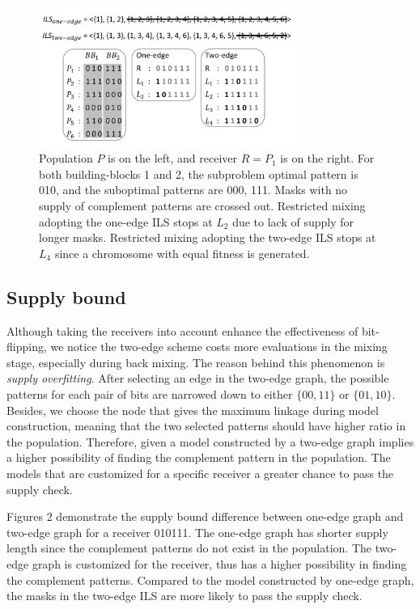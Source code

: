 \documentclass{sig-alternate-05-2015}
\begin{document}
\begin{figure}
\centering
\includegraphics[width=3.4in]{SupplyBound}
\caption{Population $ P $ is on the left, and receiver $ R  = P_{1} $ is on the right. For both building-blocks 1 and 2, the subproblem optimal pattern is 010, and the suboptimal patterns are 000, 111. Masks with no supply of complement patterns are crossed out. Restricted mixing adopting the one-edge ILS stops at $ L_{2}$ due to lack of supply for longer masks. Restricted mixing adopting the two-edge ILS stops at $ L_{4} $ since a chromosome with equal fitness is generated.}
\end{figure}



\subsection{Supply bound}
Although taking the receivers into account enhance the effectiveness of bit-flipping, we notice the two-edge scheme costs more evaluations in the mixing stage, especially during back mixing. The reason behind this phenomenon is \textit{supply overfitting}. After selecting an edge in the two-edge graph, the possible patterns for each pair of bits are narrowed down to either $\{00, 11\}$ or $\{01, 10\}$. Besides, we choose the node that gives the maximum linkage during model construction, meaning that the two selected patterns should have higher ratio in the population. Therefore, given a model constructed by a two-edge graph implies a higher possibility of finding the complement pattern in the population. The models that are customized for a specific receiver a greater chance to pass the supply check. 


Figures 2 demonstrate the supply bound difference between one-edge graph and two-edge graph for a receiver 010111. The one-edge graph has shorter supply length since the complement patterns do not exist in the population. The two-edge graph is customized for the receiver, thus has a higher possibility in finding the complement patterns. Compared to the model constructed by one-edge graph, the masks in the two-edge ILS are more likely to pass the supply check. 
\end{document}
